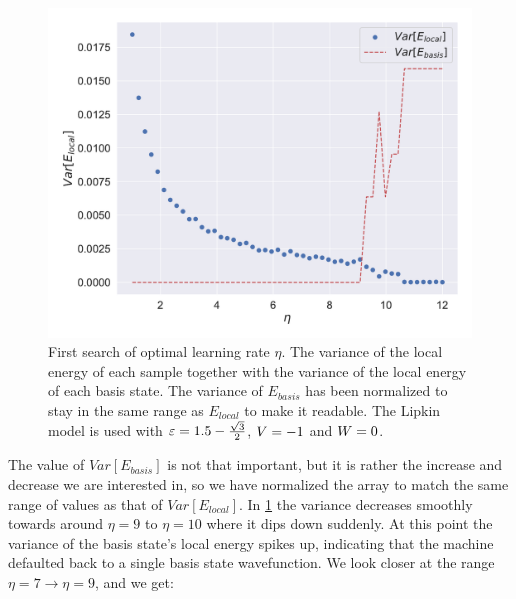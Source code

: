 \begin{figure}[H]
  \begin{center}
    \includegraphics[width=\optgridwidhtratio\textwidth]{Figures/Plots/OPt/Lipkin/[2][learning_rate][e=500][1.0-12.0]}
  \end{center}
  \caption{First search of optimal learning rate $\eta$. The variance of the local energy of each sample together with the variance of the local energy of each basis state. The variance of $E_{basis}$ has been normalized to stay in the same range as $E_{local}$ to make it readable. The Lipkin model is used with $\varepsilon = 1.5 - \frac{\sqrt{3}}{2}$, $V = -1$ and $W = 0$.}\label{fig:lr_depth1}
\end{figure}

The value of $Var[E_{basis}]$ is not that important, but it is rather the increase and decrease we are interested in, so we have normalized the array to match the same range of values as that of $Var[E_{local}]$. In \ref{fig:lr_depth1} the variance decreases smoothly towards around $\eta = 9$ to $\eta = 10$ where it dips down suddenly. At this point the variance of the basis state's local energy spikes up, indicating that the machine defaulted back to a single basis state wavefunction. We look closer at the range $\eta = 7 \rightarrow \eta = 9$, and we get:

